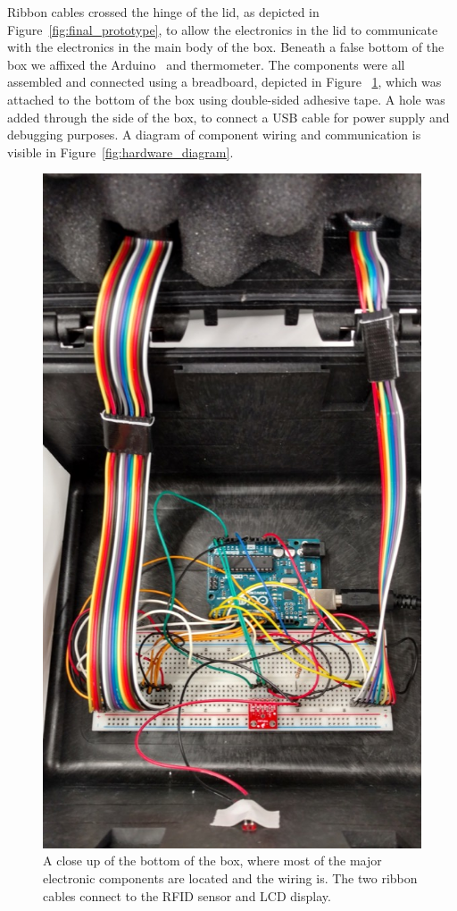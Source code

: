 \documentclass{sigchi}
\begin{document}
Ribbon cables crossed the hinge of the lid, as depicted in
Figure~\ref{fig:final_prototype}, to allow the electronics in the lid to
communicate with the electronics in the main body of the box. Beneath a false
bottom of the box we affixed the Arduino~\cite{arduino} and thermometer. The
components were all assembled and connected using a breadboard, depicted in Figure ~\ref{fig:wiring}, which was attached to the bottom of the box using double-sided
adhesive tape. A hole was added through the side of the box, to connect a USB cable
for power supply and debugging purposes. A diagram of component wiring and
communication is visible in Figure~\ref{fig:hardware_diagram}.

\begin{figure}[!ht]
\centering
\includegraphics[width=\columnwidth]{box_bottom}
\caption{A close up of the bottom of the box, where most of the major
	electronic components are located and the wiring is. The two ribbon
    cables connect to the RFID sensor and LCD display.}
\label{fig:wiring}
\end{figure}
\end{document}
